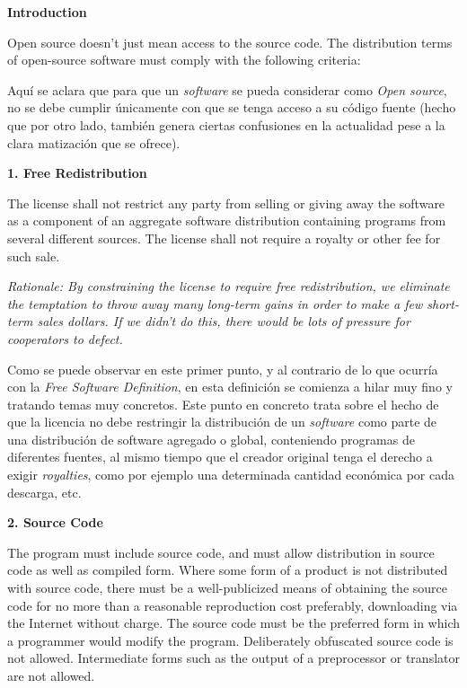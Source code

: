 {\bf Introduction

Open source doesn't just mean access to the source code. The distribution terms
of open-source software must comply with the following criteria:}\newline

Aquí se aclara que para que un \textit{software} se pueda considerar como
\textit{Open source}, no se debe cumplir únicamente con que se tenga acceso a su
código fuente (hecho que por otro lado, también genera ciertas confusiones en la
actualidad pese a la clara matización que se ofrece).\newline

{\bf 1. Free Redistribution

The license shall not restrict any party from selling or giving away the
software as a component of an aggregate software distribution containing
programs from several different sources. The license shall not require a royalty
or other fee for such sale.}

\textit{Rationale: By constraining the license to require free redistribution,
we eliminate the temptation to throw away many long-term gains in order to make
a few short-term sales dollars. If we didn't do this, there would be lots
of pressure for cooperators to defect.}\newline

Como se puede observar en este primer punto, y al contrario de lo que ocurría
con la \textit{Free Software Definition}, en esta definición se comienza a hilar
muy fino y tratando temas muy concretos. Este punto en concreto trata sobre
el hecho de que la licencia no debe restringir la distribución de un
\textit{software} como parte de una distribución de software agregado o global,
conteniendo programas de diferentes fuentes, al mismo tiempo que el creador
original tenga el derecho a exigir \textit{royalties}, como por ejemplo una
determinada cantidad económica por cada descarga, etc.\newline

{\bf 2. Source Code

The program must include source code, and must allow distribution in source code
as well as compiled form. Where some form of a product is not distributed with
source code, there must be a well-publicized means of obtaining the source code
for no more than a reasonable reproduction cost preferably, downloading via the
Internet without charge. The source code must be the preferred form in which a
programmer would modify the program. Deliberately obfuscated source code is not
allowed. Intermediate forms such as the output of a preprocessor or translator
are not allowed.}

